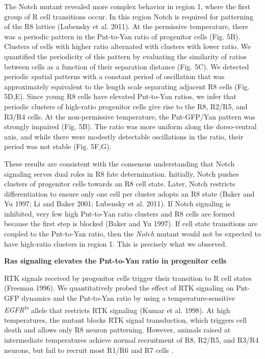 The Notch mutant revealed more complex behavior in region 1, where the first group of R cell transitions occur. In this region Notch is required for patterning of the R8 lattice (Lubensky et al. 2011). At the permissive temperature, there was a periodic pattern in the Pnt-to-Yan ratio of progenitor cells (Fig. 5B). Clusters of cells with higher ratio alternated with clusters with lower ratio. We quantified the periodicity of this pattern by evaluating the similarity of ratios between cells as a function of their separation distance (Fig. 5C). We detected periodic spatial patterns with a constant period of oscillation that was approximately equivalent to the length scale separating adjacent R8 cells (Fig. 5D,E). Since young R8 cells have elevated Pnt-to-Yan ratios, we infer that periodic clusters of high-ratio progenitor cells give rise to the R8, R2/R5, and R3/R4 cells. At the non-permissive temperature, the Pnt-GFP/Yan pattern was strongly impaired (Fig. 5B). The ratio was more uniform along the dorso-ventral axis, and while there were modestly detectable oscillations in the ratio, their period was not stable (Fig. 5F,G).

These results are consistent with the consensus understanding that Notch signaling serves dual roles in R8 fate determination. Initially, Notch pushes clusters of progenitor cells towards an R8 cell state. Later, Notch restricts differentiation to ensure only one cell per cluster adopts an R8 state (Baker and Yu 1997; Li and Baker 2001; Lubensky et al. 2011). If Notch signaling is inhibited, very few high Pnt-to-Yan ratio clusters and R8 cells are formed because the first step is blocked (Baker and Yu 1997). If cell state transitions are coupled to the Pnt-to-Yan ratio, then the \textit{Notch} mutant would not be expected to have high-ratio clusters in region 1. This is precisely what we observed.

\textbf{Ras signaling elevates the Pnt-to-Yan ratio in progenitor cells}

RTK signals received by progenitor cells trigger their transition to R cell states (Freeman 1996). We quantitatively probed the effect of RTK signaling on Pnt-GFP dynamics and the Pnt-to-Yan ratio by using a temperature-sensitive \textit{EGFR\textsuperscript{ts}} allele that restricts RTK signaling (Kumar et al. 1998). At high temperatures, the mutant blocks RTK signal transduction, which triggers cell death and allows only R8 neuron patterning. However, animals raised at intermediate temperatures achieve normal recruitment of R8, R2/R5, and R3/R4 neurons, but fail to recruit most R1/R6 and R7 cells \cite{Pelaez2015}.

